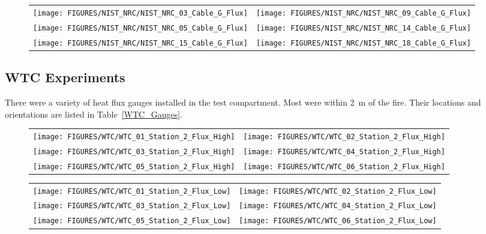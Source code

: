 \begin{figure}[p]
\begin{tabular*}{\textwidth}{l@{\extracolsep{\fill}}r}
\texttt{[image: FIGURES/NIST\_NRC/NIST\_NRC\_03\_Cable\_G\_Flux]} &
\texttt{[image: FIGURES/NIST\_NRC/NIST\_NRC\_09\_Cable\_G\_Flux]} \\
\texttt{[image: FIGURES/NIST\_NRC/NIST\_NRC\_05\_Cable\_G\_Flux]} &
\texttt{[image: FIGURES/NIST\_NRC/NIST\_NRC\_14\_Cable\_G\_Flux]} \\
\texttt{[image: FIGURES/NIST\_NRC/NIST\_NRC\_15\_Cable\_G\_Flux]} &
\texttt{[image: FIGURES/NIST\_NRC/NIST\_NRC\_18\_Cable\_G\_Flux]}
\end{tabular*}
\label{NIST_NRC_Cable_G_Flux_Open}
\end{figure}

\clearpage

\subsection{WTC Experiments}

There were a variety of heat flux gauges installed in the test compartment. Most were within 2~m of the fire. Their locations and orientations are listed in Table~\ref{WTC_Gauges}.


\begin{figure}[h!]
\begin{tabular*}{\textwidth}{l@{\extracolsep{\fill}}r}
\texttt{[image: FIGURES/WTC/WTC\_01\_Station\_2\_Flux\_High]} &
\texttt{[image: FIGURES/WTC/WTC\_02\_Station\_2\_Flux\_High]} \\
\texttt{[image: FIGURES/WTC/WTC\_03\_Station\_2\_Flux\_High]} &
\texttt{[image: FIGURES/WTC/WTC\_04\_Station\_2\_Flux\_High]} \\
\texttt{[image: FIGURES/WTC/WTC\_05\_Station\_2\_Flux\_High]} &
\texttt{[image: FIGURES/WTC/WTC\_06\_Station\_2\_Flux\_High]}
\end{tabular*}
\label{NIST_WTC_Station_2_Flux_High}
\end{figure}

\newpage

\begin{figure}[p]
\begin{tabular*}{\textwidth}{l@{\extracolsep{\fill}}r}
\texttt{[image: FIGURES/WTC/WTC\_01\_Station\_2\_Flux\_Low]} &
\texttt{[image: FIGURES/WTC/WTC\_02\_Station\_2\_Flux\_Low]} \\
\texttt{[image: FIGURES/WTC/WTC\_03\_Station\_2\_Flux\_Low]} &
\texttt{[image: FIGURES/WTC/WTC\_04\_Station\_2\_Flux\_Low]} \\
\texttt{[image: FIGURES/WTC/WTC\_05\_Station\_2\_Flux\_Low]} &
\texttt{[image: FIGURES/WTC/WTC\_06\_Station\_2\_Flux\_Low]}
\end{tabular*}
\label{NIST_WTC_Station_2_Flux_Low}
\end{figure}

